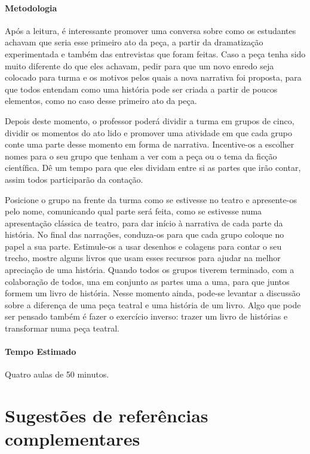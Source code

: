 \documentclass[11pt]{extarticle}
\begin{document}
\paragraph{Metodologia} Após a leitura, é interessante promover uma conversa sobre como os estudantes achavam que seria esse primeiro ato da peça, a partir da dramatização experimentada e também das entrevistas que foram feitas. Caso a peça tenha sido muito diferente do que eles achavam, pedir para que um novo enredo seja colocado para turma e os motivos pelos quais a nova narrativa foi proposta, para que todos entendam como uma história pode ser criada a partir de poucos elementos, como no caso desse primeiro ato da peça.

Depois deste momento, o professor poderá dividir a turma em grupos de cinco, dividir os momentos do ato lido e promover uma atividade em que cada grupo conte uma parte desse momento em forma de narrativa. Incentive-os a escolher nomes para o seu grupo que tenham a ver com a peça ou o tema da ficção científica. Dê um tempo para que eles dividam entre si as partes que irão contar, assim todos participarão da contação.

Posicione o grupo na frente da turma como se estivesse no teatro e apresente-os pelo nome, comunicando qual parte será feita, como se estivesse numa apresentação clássica de teatro, para dar início à narrativa de cada parte da história. No final das narrações, conduza-os para que cada grupo coloque no papel a sua parte. Estimule-os a usar desenhos e colagens para contar o seu trecho, mostre alguns livros que usam esses recursos para ajudar na melhor apreciação de uma história. Quando todos os grupos tiverem terminado, com a colaboração de todos, una em conjunto as partes uma a uma, para que juntos formem um livro de história. Nesse momento ainda, pode-se levantar a discussão sobre a diferença de uma peça teatral e uma história de um livro. Algo que pode ser pensado também é fazer o exercício inverso: trazer um livro de histórias e transformar numa peça teatral. 

\paragraph{Tempo Estimado} Quatro aulas de 50 minutos.   


\section{Sugestões de referências complementares}
\end{document}
